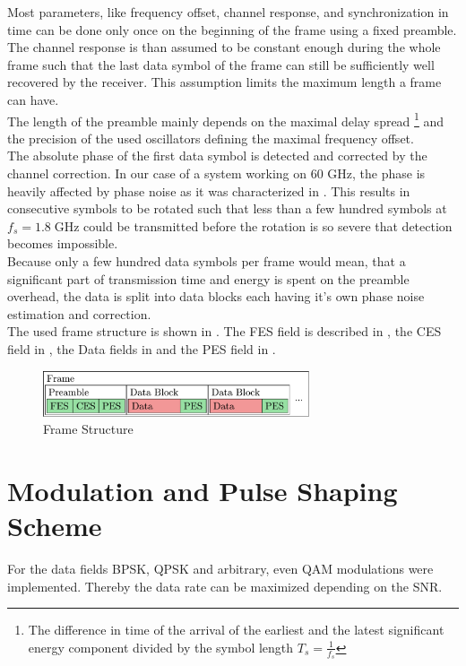 Most parameters, like frequency offset, channel response, and
synchronization in time can be done only once on the beginning of the
frame using a fixed preamble.
The channel response is than assumed to be constant enough during
the whole frame such that the last data symbol of the frame can still be
sufficiently well recovered by the receiver.
This assumption limits the maximum length a frame can have. \\

The length of the preamble mainly depends on the maximal delay spread%
\footnote{The difference in time of the arrival of the earliest and the
  latest significant energy component divided by the symbol length
  $T_s = \frac{1}{f_s}$} and the precision of the used oscillators defining
the maximal frequency offset. \\

The absolute phase of the first data symbol is detected and corrected by the
channel correction. In our case of a system working on 60 GHz, the
phase is heavily affected by phase noise as it was characterized in
. This results in consecutive symbols to be
rotated such that less than a few hundred symbols at $f_s = 1.8 \;\text{GHz}$
could be transmitted before the rotation is so severe that detection
becomes impossible. \\

Because only a few hundred data symbols per frame would mean,
that a significant part of transmission time and energy is spent
on the preamble overhead, the data is split into data blocks each having
it's own phase noise estimation and correction. \\

The used frame structure is shown in .
The \gls{FES} field is described in ,
the \gls{CES} field in ,
the Data fields in  and the
\gls{PES} field in .

\begin{figure}[ht]
  \centering
  \includegraphics[width=0.7\textwidth]{figures/frame_struct}
  \caption{Frame Structure}
  \label{fig:sys_frame_struct}
\end{figure}

\section{Modulation and Pulse Shaping Scheme}
For the data fields \gls{BPSK}, \gls{QPSK} and arbitrary, even
\gls{QAM} modulations were implemented. Thereby the data rate
can be maximized depending on the \gls{SNR}. \\


